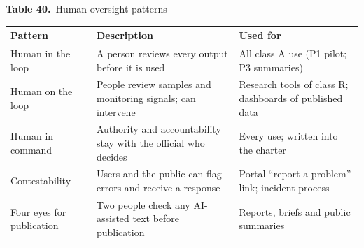 \documentclass[border=10pt]{standalone}
\begin{document}
\begin{minipage}{17cm}
{\large\bfseries Table 40.}\ {\large Human oversight patterns}\par\vspace{7pt}
\small
{}
\begin{tabularx}{\linewidth}{@{}>{\hsize=0.712\hsize\raggedright\arraybackslash}X>{\hsize=1.312\hsize\raggedright\arraybackslash}X>{\hsize=0.975\hsize\raggedright\arraybackslash}X@{}}
\arrayrulecolor{bapilrule}\toprule
\rowcolor{white}\textbf{Pattern} & \textbf{Description} & \textbf{Used for} \\
\midrule
Human in the loop & A person reviews every output before it is used & All class A use (P1 pilot; P3 summaries) \\
Human on the loop & People review samples and monitoring signals; can intervene & Research tools of class R; dashboards of published data \\
Human in command & Authority and accountability stay with the official who decides & Every use; written into the charter \\
Contestability & Users and the public can flag errors and receive a response & Portal “report a problem” link; incident process \\
Four eyes for publication & Two people check any AI-assisted text before publication & Reports, briefs and public summaries \\
\bottomrule
\end{tabularx}
\par{}
\end{minipage}
\end{document}
